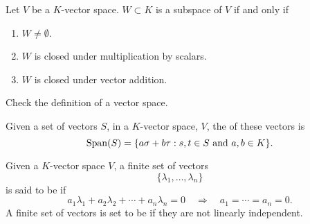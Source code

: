 \documentclass{ximera}
\begin{document}
\begin{lemma}
  Let $V$ be a $K$-vector space. $W\subset K$ is a subspace of $V$ if
  and only if
  \begin{enumerate}
  \item $W\ne \emptyset$.
  \item $W$ is closed under multiplication by scalars.
  \item $W$ is closed under vector addition.
  \end{enumerate}
  \begin{sketch}
    Check the definition of a vector space.
  \end{sketch}
\end{lemma}



\begin{definition}
  Given a set of vectors $S$, in a $K$-vector space, $V$, the
   of these vectors is
  \[
  \operatorname{Span}(S) = \{a\sigma+b\tau:\text{$s,t\in S$ and $a,b\in K$}\}.
  \]
\end{definition}


\begin{definition}
  Given a $K$-vector space $V$, a finite set of vectors
  \[
  \{\lambda_1,\dots,\lambda_n\}
  \]
  is said to be  if
  \[
  a_1\lambda_1 + a_2\lambda_2 +\cdots + a_n\lambda_n = 0\quad \Rightarrow \quad a_1= \cdots =a_n = 0.
  \]
  A finite set of vectors is set to be  if
  they are not linearly independent.
\end{definition}
\end{document}
